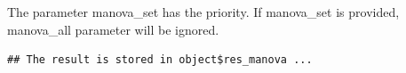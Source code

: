 \documentclass[
]{book}
\newenvironment{Shaded}{\begin{snugshade}}{\end{snugshade}}
\newcommand{\AttributeTok}[1]{\textcolor[rgb]{0.77,0.63,0.00}{#1}}
\newcommand{\CommentTok}[1]{\textcolor[rgb]{0.56,0.35,0.01}{\textit{#1}}}
\newcommand{\FunctionTok}[1]{\textcolor[rgb]{0.00,0.00,0.00}{#1}}
\newcommand{\NormalTok}[1]{#1}
\newcommand{\SpecialCharTok}[1]{\textcolor[rgb]{0.00,0.00,0.00}{#1}}
\newcommand{\StringTok}[1]{\textcolor[rgb]{0.31,0.60,0.02}{#1}}
\begin{document}
The parameter manova\_set has the priority. If manova\_set is provided, manova\_all parameter will be ignored.

\begin{Shaded}
\end{Shaded}

\begin{verbatim}
## The result is stored in object$res_manova ...
\end{verbatim}
\end{document}
